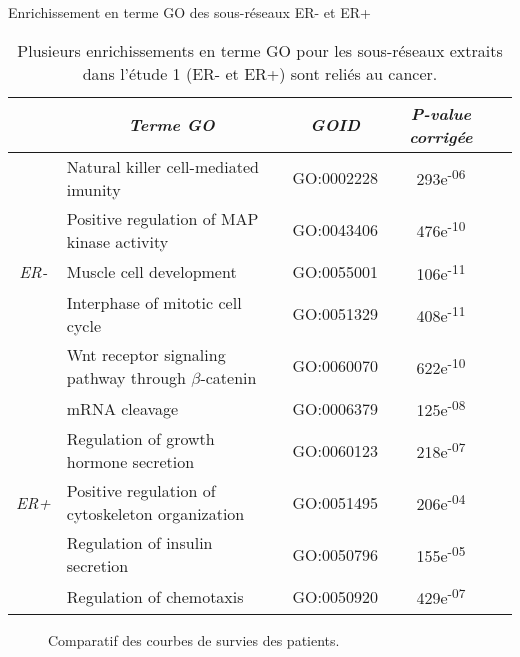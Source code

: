 		\begin{table}
				\begin{center}
					\caption{Enrichissement en terme GO des sous-réseaux ER- et ER+}
					\begin{tabular}{clccr}
						\toprule
						& \multicolumn{1}{c}{\emph{Terme GO}} & \emph{GOID} & \emph{P-value corrigée} \\
						\midrule
						\multirow{5}{*}{\emph{ER-}} & Natural killer cell-mediated imunity                      & GO:0002228  & 293e\textsuperscript{-06} \\
																				& Positive regulation of MAP kinase activity                & GO:0043406  & 476e\textsuperscript{-10} \\
																				& Muscle cell development                                   & GO:0055001  & 106e\textsuperscript{-11} \\
																				& Interphase of mitotic cell cycle                          & GO:0051329  & 408e\textsuperscript{-11} \\
																				& Wnt receptor signaling pathway through ${\beta}$-catenin  & GO:0060070  & 622e\textsuperscript{-10} \\
						\midrule
						\multirow{5}{*}{\emph{ER+}} & mRNA cleavage                                             & GO:0006379  & 125e\textsuperscript{-08} \\
																				& Regulation of growth hormone secretion                    & GO:0060123  & 218e\textsuperscript{-07} \\
																				& Positive regulation of cytoskeleton organization          & GO:0051495  & 206e\textsuperscript{-04} \\
																				& Regulation of insulin secretion                           & GO:0050796  & 155e\textsuperscript{-05} \\
																				& Regulation of chemotaxis                                  & GO:0050920  & 429e\textsuperscript{-07} \\
						\bottomrule
					\end{tabular}
					\label{tab:Res2GO}
					\vspace{5ex}
					\caption*{Plusieurs enrichissements en terme GO pour les sous-réseaux extraits dans l'étude 1 (ER- et ER+) sont reliés au cancer.}
				\end{center}
			\end{table}

			\begin{figure}
				\begin{center}
					\def\svgwidth{\columnwidth}
					\caption{Comparatif des courbes de survies des patients.}
					\label{fig:Survival}
				\end{center}
			\end{figure}

